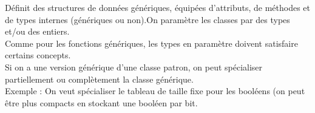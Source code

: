  Définit des structures de données génériques, équipées d'attributs, de méthodes et de types internes (génériques ou non).On paramètre les classes par des types et/ou des entiers. \\
Comme pour les fonctions génériques, les types en paramètre doivent satisfaire certains concepts.\\

 Si on a une version générique d'une classe patron, on peut spécialiser partiellement ou complètement la classe générique. \\
Exemple : On veut spécialiser le tableau de taille fixe pour les booléens (on peut être plus compacts en stockant une booléen par bit.
